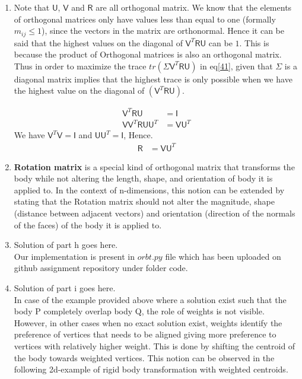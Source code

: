 \documentclass[a4paper, 11pt]{article}
\newcommand{\mat}[1]{\boldsymbol { \mathsf{#1}} }
\begin{document}
\begin{enumerate}[label=\alph*.]
    \item
    Note that $\mat U$, $\mat V$ and $\mat R$ are all orthogonal matrix. We know that the elements of orthogonal matrices only have values less than equal to one (formally $m_{ij} \leq 1$), since the vectors in the matrix are orthonormal. Hence it can be said that the highest values on the diagonal of $\mat V^T \mat R \mat U$ can be $1$. This is because the product of Orthogonal matrices is also an orthogonal matrix. Thus in order to maximize the trace $tr(\mat \Sigma \mat V^T \mat R \mat U)$ in eq\eqref{41}, given that $\mat \Sigma$ is a diagonal matrix implies that the highest trace is only possible when we have the highest value on the diagonal of $(\mat V^T \mat R \mat U)$.
    
    \begin{align}
        \mat V^T \mat R \mat U & = \mat I\\
        \mat V \mat V^T \mat R \mat U \mat U^T &= \mat V \mat U^T
    \end{align}
    We have $\mat V^T \mat V = \mat I$ and $\mat U \mat U^T = \mat I$, Hence.
    \begin{align}
        \mat R &= \mat V \mat U^T
    \end{align}
    
    
    
    \item
    \textbf{Rotation matrix} is a special kind of orthogonal matrix that transforms the body while not altering the length, shape, and orientation of body it is applied to. In the context of n-dimensions, this notion can be extended by stating that the Rotation matrix should not alter the magnitude, shape (distance between adjacent vectors) and orientation (direction of the normals of the faces) of the body it is applied to.
    
    \item
    Solution of part h goes here.\\
    Our implementation is present in $orbt.py$ file which has been uploaded on github assignment repository under folder code.
    
    \item
    Solution of part i goes here.\\
    In case of the example provided above where a solution exist such that the body P completely overlap body Q, the role of weights is not visible. However, in other cases when no exact solution exist, weights identify the preference of vertices that needs to be aligned giving more preference to vertices with relatively higher weight. This is done by shifting the centroid of the body towards weighted vertices. This notion can be observed in the following 2d-example of rigid body transformation with weighted centroids.
    
    
    
\end{enumerate}
\end{document}
